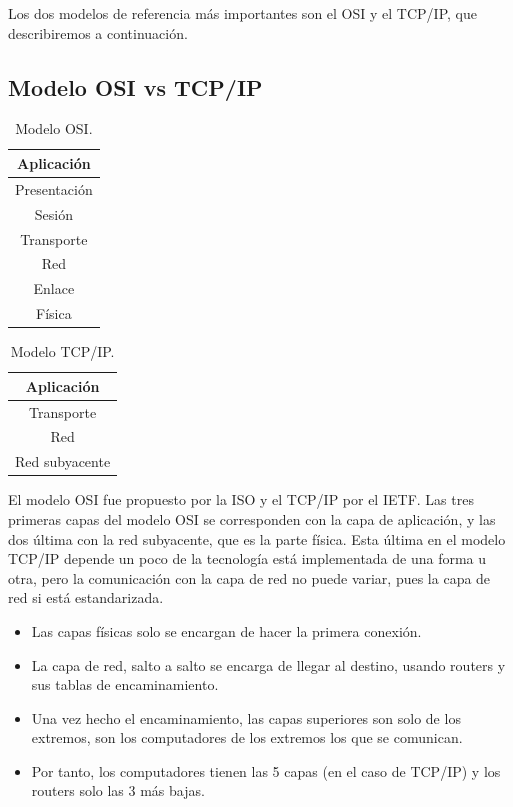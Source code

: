 Los dos modelos de referencia más importantes son el \acrshort{OSI} y el TCP/IP, que describiremos a continuación.
\subsection{Modelo OSI vs TCP/IP}
\begin{table}[H]
\centering
\begin{tabular}{|c|}
    \hline
    Aplicación \\\hline
    Presentación \\\hline
    Sesión \\ \hline
    Transporte \\ \hline
    Red \\\hline
    Enlace \\\hline
    Física \\\hline
\end{tabular}
\caption{Modelo OSI.}
\label{tab:mod_osi}
\end{table}

\begin{table}[H]
\centering
\begin{tabular}{|c|}
    \hline
    Aplicación \\\hline
    Transporte \\ \hline
    Red \\\hline
    Red subyacente \\\hline
\end{tabular}
\caption{Modelo TCP/IP.}
\label{tab:mod_tcp}
\end{table}

El modelo \acrfull{OSI} fue propuesto por la \acrshort{ISO} y el TCP/IP por el \acrshort{IETF}. Las tres primeras capas del modelo \acrshort{OSI} se corresponden con la capa de aplicación, y las dos última con la red subyacente, que es la parte física. Esta última en el modelo TCP/IP depende un poco de la tecnología está implementada de una forma u otra, pero la comunicación con la capa de red no puede variar, pues la capa de red si está estandarizada. 

\begin{itemize}
    \item Las capas físicas solo se encargan de hacer la primera conexión.
    \item La capa de red, salto a salto se encarga de llegar al destino, usando routers y sus tablas de encaminamiento. 
    \item Una vez hecho el encaminamiento, las capas superiores son solo de los extremos, son los computadores de los extremos los que se comunican. 
    \item Por tanto, los computadores tienen las 5 capas (en el caso de TCP/IP) y los routers solo las 3 más bajas. 
\end{itemize}



